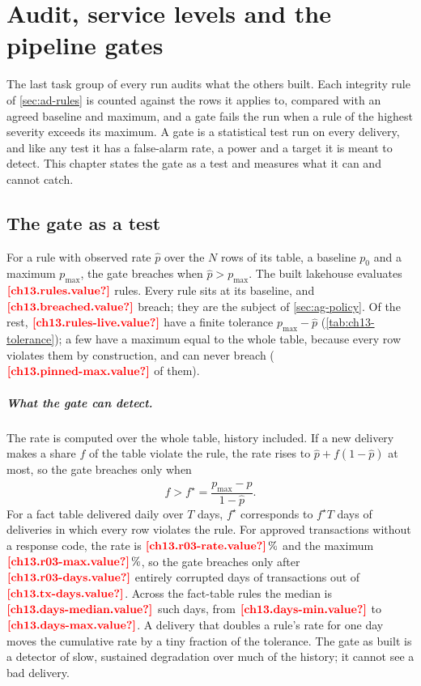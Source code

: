 \chapter{Audit, service levels and the pipeline gates}\label{ch:audit-and-gates}

The last task group of every run audits what the others built. Each integrity rule of \cref{sec:ad-rules} is counted
against the rows it applies to, compared with an agreed baseline and maximum, and a gate fails the run when a rule of the
highest severity exceeds its maximum. A gate is a statistical test run on every delivery, and like any test it has a
false-alarm rate, a power and a target it is meant to detect. This chapter states the gate as a test and measures what it
can and cannot catch.

\section{The gate as a test}\label{sec:ag-test}

For a rule with observed rate $\hat p$ over the $N$ rows of its table, a baseline $p_0$ and a maximum $p_{\max}$, the gate
breaches when $\hat p > p_{\max}$. The built lakehouse evaluates $\est{ch13.rules}{value}$ rules. Every rule sits at its
baseline, and $\est{ch13.breached}{value}$ breach; they are the subject of \cref{sec:ag-policy}. Of the rest,
$\est{ch13.rules-live}{value}$ have a finite tolerance $p_{\max} - \hat p$ (\cref{tab:ch13-tolerance}); a few have a maximum equal to
the whole table, because every row violates them by construction, and can never breach
($\est{ch13.pinned-max}{value}$ of them).

\paragraph{What the gate can detect.} The rate is computed over the whole table, history included. If a new delivery makes
a share $f$ of the table violate the rule, the rate rises to $\hat p + f(1 - \hat p)$ at most, so the gate breaches only when
\begin{equation}\label{eq:ag-share}
  f > f^{\star} = \frac{p_{\max} - \hat p}{1 - \hat p}.
\end{equation}
For a fact table delivered daily over $T$ days, $f^{\star}$ corresponds to $f^{\star} T$ days of deliveries in which every
row violates the rule. For approved transactions without a response code, the rate is $\est{ch13.r03-rate}{value}\,\%$ and the
maximum $\est{ch13.r03-max}{value}\,\%$, so the gate breaches only after $\est{ch13.r03-days}{value}$ entirely corrupted days of
transactions out of $\est{ch13.tx-days}{value}$. Across the fact-table rules the median is $\est{ch13.days-median}{value}$ such
days, from $\est{ch13.days-min}{value}$ to $\est{ch13.days-max}{value}$. A delivery that doubles a rule's rate for one day moves
the cumulative rate by a tiny fraction of the tolerance. The gate as built is a detector of slow, sustained degradation over
much of the history; it cannot see a bad delivery.

